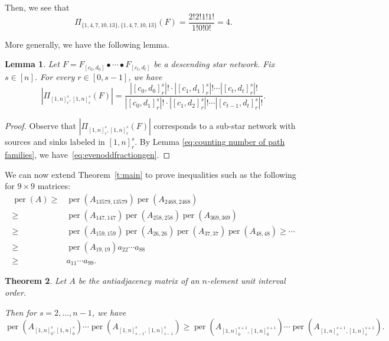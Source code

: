 \documentclass[12pt]{amsart}
\newtheorem{thm}{Theorem}[section]
\newtheorem{lem}[thm]{Lemma}
\theoremstyle{definition}
\numberwithin{equation}{section}
\DeclareMathOperator{\perm}{per}
\begin{document}
Then, we see that \begin{equation*}
    \Pi_{\{1,4,7,10,13\},\{1,4,7,10,13\}}(F) = \frac{2!2!1!1!}{1!0!0!} = 4.
\end{equation*}

More generally, we have the following lemma.

\begin{lem}\label{eq:counting r mod s} Let $F = F_{[c_0,d_0]} \bullet \cdots \bullet F_{[c_t,d_t]}$ be a descending star network. Fix $s\in[n]$. For every $r\in[0,s-1]$, we have
\begin{equation}\label{eq:evenoddfractiongen}
    |\Pi_{[1,n]_{r}^{s},[1,n]_{r}^{s}}(F)| = \frac{ |[c_0,d_0]_{r}^{s}|! \cdot |[c_1,d_1]_r^s|! \cdots |[c_t,d_t]_{r}^{s}|!}{|[c_0,d_1]_{r}^{s}|! \cdot |[c_1,d_2]_r^s|! \cdots |[c_{t-1},d_{t}]_r^s|!}.
\end{equation}
\end{lem}

\begin{proof}
   Observe that $|\Pi_{[1,n]_{r}^{s},[1,n]_{r}^{s}}(F)|$ corresponds to a sub-star network with sources and sinks labeled in $[1,n]_{r}^{s}$. By Lemma \ref{eq:counting number of path families}, we have~\eqref{eq:evenoddfractiongen}.
\end{proof}

We can now extend Theorem~\ref{t:main} to prove inequalities such as the following for $9\times 9$ matrices:
\begin{equation*}
\begin{split}
\perm(A)
\geq & \perm(A_{13579,13579})\perm(A_{2468,2468}) \\
\geq & \perm(A_{147,147})\perm(A_{258,258})\perm(A_{369,369}) \\
\geq & \perm(A_{159,159})\perm(A_{26,26})\perm(A_{37,37})\perm(A_{48,48}) \geq \cdots \\
\geq & \perm(A_{19,19})a_{22}\cdots a_{88} \\
\geq & a_{11}\cdots a_{99}.
\end{split}
\end{equation*}

\begin{thm}\label{t:rmodsmain}
   Let $A$ be the antiadjacency matrix of an $n$-element unit interval order.

    Then for $s=2,\ldots, n-1$, we have
    \begin{equation}\label{eq:new inequality}
   \perm(A_{[1,n]_0^s,[1,n]_0^s})\cdots \perm(A_{[1,n]_{s-1}^s,[1,n]_{s-1}^s})\geq \perm(A_{[1,n]_0^{s+1},[1,n]_0^{s+1}})\cdots\perm(A_{[1,n]_s^{s+1},[1,n]_s^{s+1}}).
    \end{equation}

\end{thm}
\end{document}
